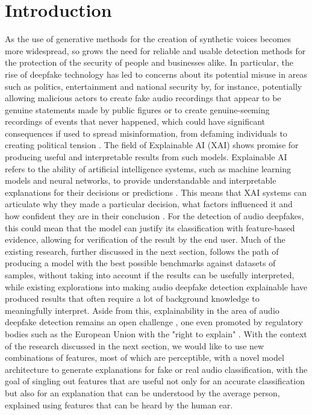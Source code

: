 \documentclass{article}
\begin{document}
    \section{Introduction}
    As the use of generative methods for the creation of synthetic voices becomes more widespread,
    so grows the need for reliable and usable detection methods for the protection of the security
    of people and businesses alike. In particular, the rise of deepfake technology has led to
	concerns about its potential misuse in areas such as politics, entertainment and national
	security by, for instance, potentially allowing malicious actors to create fake audio
	recordings that appear to be genuine statements made by public figures or to create
	genuine-seeming recordings of events that never happened, which could have significant
	consequences if used to spread misinformation, from defaming individuals to creating political
	tension \cite{veerasamy_rising_2022,albahar_deepfakes_2005}. The field of Explainable AI (XAI)
	shows promise for producing useful and interpretable results from such models. Explainable AI
	refers to the ability of artificial intelligence systems, such as machine learning models and
	neural networks, to provide understandable and interpretable explanations for their decisions
	or predictions \cite{hind_explaining_2019}. This means that XAI systems can articulate why
	they made a particular decision, what factors influenced it and how confident they are in
	their conclusion \cite{hind_explaining_2019}. For the detection of audio deepfakes, this could
	mean that the model can justify its classification with feature-based evidence, allowing for
	verification of the result by the end user. Much of the existing research, further discussed
	in the next section, follows the path of producing a model with the best possible benchmarks
	against datasets of samples, without taking into account if the results can be usefully
	interpreted, while existing explorations into making audio deepfake detection explainable have
	produced results that often require a lot of background knowledge to meaningfully interpret.
	Aside from this, explainability in the area of audio deepfake detection remains an open
	challenge \cite{cuccovillo_open_2022}, one even promoted by regulatory bodies such as the
	European Union with the "right to explain" \cite{goodman_european_2017}. With the context of
	the research discussed in the next section, we would like to use new combinations of features,
	most of which are perceptible, with a novel model architecture to generate explanations for
	fake or real audio classification, with the goal of singling out features that are useful not
	only for an accurate classification but also for an explanation that can be understood by the
	average person, explained using features that can be heard by the human ear.
\end{document}
